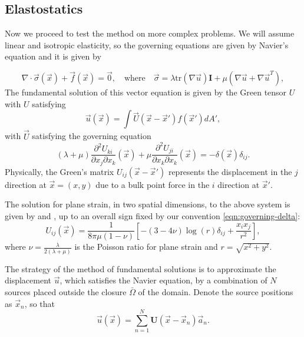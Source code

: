\documentclass{article}
\begin{document}
 \subsection{Elastostatics}
 Now we proceed to test the method on more complex problems. We will assume linear and isotropic elasticity, so the governing equations are given by Navier's equation and it is given by

\begin{equation} \label{eqn:navier-constitutive}
    \nabla \cdot \vec \sigma(\vec x) + \vec f(\vec x) = \vec 0, \quad \text{where} \quad \vec \sigma =  \lambda \mathrm{tr}(\nabla \vec u)  \mathbf I + \mu(\nabla \vec u +\nabla \vec u^T),
\end{equation}
The fundamental solution of this vector equation is given by the Green tensor $U$ with $U$ satisfying
\begin{equation}
    \vec u (\vec x)=\int \vec U(\vec x- \vec x')f(\vec{x}') dA',
\end{equation}
with $\vec U$ satisfying the governing equation
\begin{equation} \label{eqn:governing-delta}
    (\lambda+\mu) \frac{\partial^2 U_{ki}}{\partial x_j \partial x_k}(\vec x) + \mu  \frac{\partial^2 U_{ji}}{\partial x_k \partial x_k}(\vec x) = -\delta(\vec x)\delta_{ij}.
\end{equation}
Physically, the Green's matrix $U_{ij}(\vec x- \vec x')$ represents the displacement in the $j$ direction at $\vec x = (x,y)$ due to a bulk point force in the $i$ direction at $\vec x'$.

The solution for plane strain, in two spatial dimensions, to the above system \cite{appsol} is given by \cite[Equation (7)]{marin2004method} and \cite[Equation (6.24)]{wang2019methods}, up to an overall sign fixed by our convention \eqref{eqn:governing-delta}:
\begin{equation} \label{eqn:displacement-MFS-2D}
  U_{ij}(\vec x) = \frac{1}{8 \pi \mu(1-\nu)}\left[ -(3-4\nu)\log(r) \delta_{ij} + \frac{x_i x_j}{r^2}\right],
\end{equation}
where $\nu=\frac{\lambda}{2(\lambda+\mu)}$ is the Poisson ratio for plane strain and $r=\sqrt{x^2+y^2}$.

The strategy of the method of fundamental solutions is to approximate the displacement $\vec u$, which satisfies the Navier equation, by a combination of $N$ sources placed outside the closure $\bar \Omega$ of the domain. Denote the source positions as $\vec x_n$, so that
\begin{equation}\label{eq:uN}
    \vec u(\vec x)= \sum_{n=1}^N \mathbf{U}(\vec x-\vec x_n) \vec{a}_n .
\end{equation}
\end{document}
